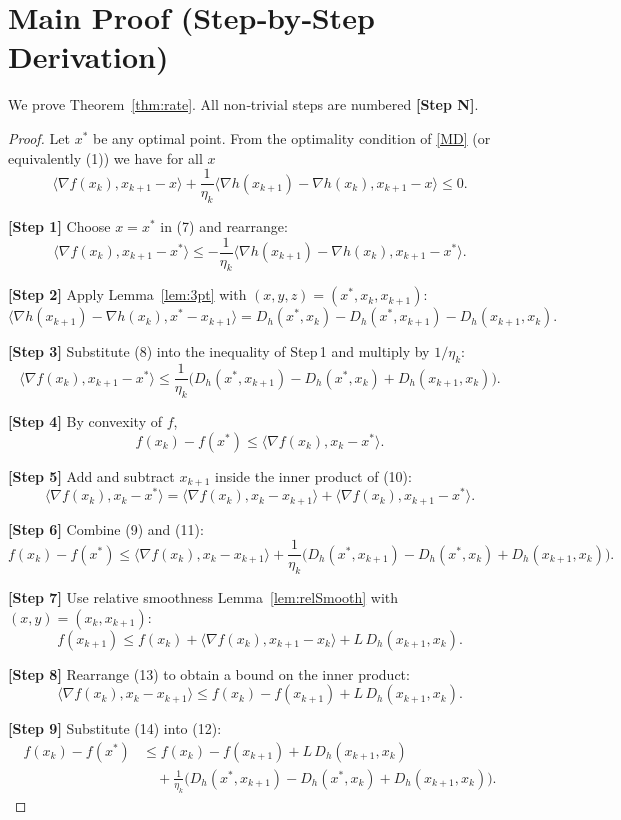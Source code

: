 \documentclass{article}
\newcommand{\inner}[2]{\langle #1,#2\rangle}
\newcommand{\D}[2]{D_{h}(#1,#2)}
\newcommand{\grad}{\nabla}
\begin{document}
\section*{Main Proof (Step‑by‑Step Derivation)}
We prove Theorem~\ref{thm:rate}.  
All non‑trivial steps are numbered \textbf{[Step N]}.

\begin{proof}
Let $x^{*}$ be any optimal point.  
From the optimality condition of \eqref{MD} (or equivalently (1)) we have for all $x$
\[
\inner{\grad f(x_k)}{x_{k+1}-x}+ \frac{1}{\eta_k}\inner{\grad h(x_{k+1})-\grad h(x_k)}{x_{k+1}-x}\le 0. \tag{7}
\]

\noindent\textbf{[Step 1]} Choose $x=x^{*}$ in (7) and rearrange:
\[
\inner{\grad f(x_k)}{x_{k+1}-x^{*}}
\le -\frac{1}{\eta_k}\inner{\grad h(x_{k+1})-\grad h(x_k)}{x_{k+1}-x^{*}}.
\]

\noindent\textbf{[Step 2]} Apply Lemma~\ref{lem:3pt} with $(x,y,z)=(x^{*},x_k,x_{k+1})$:
\[
\inner{\grad h(x_{k+1})-\grad h(x_k)}{x^{*}-x_{k+1}}
= \D{x^{*}}{x_k}-\D{x^{*}}{x_{k+1}}-\D{x_{k+1}}{x_k}. \tag{8}
\]

\noindent\textbf{[Step 3]} Substitute (8) into the inequality of Step 1 and multiply by $1/\eta_k$:
\[
\inner{\grad f(x_k)}{x_{k+1}-x^{*}}
\le \frac{1}{\eta_k}\Big(\D{x^{*}}{x_{k+1}}-\D{x^{*}}{x_k}+\D{x_{k+1}}{x_k}\Big). \tag{9}
\]

\noindent\textbf{[Step 4]} By convexity of $f$,
\[
f(x_{k})-f(x^{*})\le \inner{\grad f(x_k)}{x_{k}-x^{*}}. \tag{10}
\]

\noindent\textbf{[Step 5]} Add and subtract $x_{k+1}$ inside the inner product of (10):
\[
\inner{\grad f(x_k)}{x_{k}-x^{*}}
= \inner{\grad f(x_k)}{x_{k}-x_{k+1}}+\inner{\grad f(x_k)}{x_{k+1}-x^{*}}. \tag{11}
\]

\noindent\textbf{[Step 6]} Combine (9) and (11):
\[
f(x_{k})-f(x^{*})
\le \inner{\grad f(x_k)}{x_{k}-x_{k+1}}
+\frac{1}{\eta_k}\Big(\D{x^{*}}{x_{k+1}}-\D{x^{*}}{x_k}+\D{x_{k+1}}{x_k}\Big). \tag{12}
\]

\noindent\textbf{[Step 7]} Use relative smoothness Lemma~\ref{lem:relSmooth} with $(x,y)=(x_k,x_{k+1})$:
\[
f(x_{k+1})\le f(x_k)+\inner{\grad f(x_k)}{x_{k+1}-x_k}+L\,\D{x_{k+1}}{x_k}. \tag{13}
\]

\noindent\textbf{[Step 8]} Rearrange (13) to obtain a bound on the inner product:
\[
\inner{\grad f(x_k)}{x_k-x_{k+1}}\le f(x_k)-f(x_{k+1})+L\,\D{x_{k+1}}{x_k}. \tag{14}
\]

\noindent\textbf{[Step 9]} Substitute (14) into (12):
\[
\begin{aligned}
f(x_{k})-f(x^{*})
&\le f(x_k)-f(x_{k+1})+L\,\D{x_{k+1}}{x_k}\\
&\quad +\frac{1}{\eta_k}\Big(\D{x^{*}}{x_{k+1}}-\D{x^{*}}{x_k}+\D{x_{k+1}}{x_k}\Big).
\end{aligned} \tag{15}
\]


\end{proof}
\end{document}
